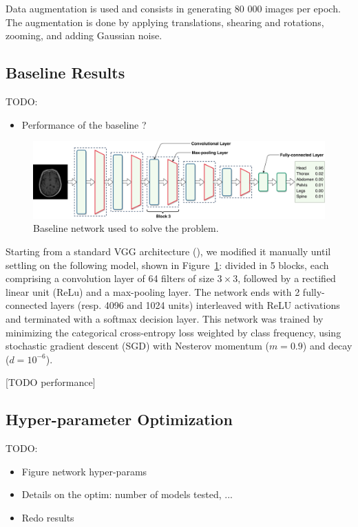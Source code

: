 Data augmentation is used and consists in generating 80 000 images per epoch. The augmentation is done by applying translations, shearing and rotations, zooming, and adding Gaussian noise.

\subsection{Baseline Results}

TODO:
\begin{itemize}
    \item Performance of the baseline ?
\end{itemize}

\begin{figure}[htb]
	\centering
	\includegraphics[width=\linewidth]{img_hyperopt/baseline.pdf}
	\caption{Baseline network used to solve the problem.}
	\label{fig:baseline}
\end{figure}

Starting from a standard VGG architecture (\textcite{simonyan2014}), we modified it manually until settling on the following model, shown in Figure~\ref{fig:baseline}: divided in 5 blocks, each comprising a convolution layer of 64 filters of size $3\times 3$, followed by a rectified linear unit (ReLu) and a max-pooling layer. The network ends with 2 fully-connected layers (resp. 4096 and 1024 units) interleaved with ReLU activations and terminated with a softmax decision layer. This network was trained by minimizing the categorical cross-entropy loss weighted by class frequency, using stochastic gradient descent (SGD) with Nesterov momentum ($m = 0.9$) and decay ($d = 10^{-6}$).

[TODO performance]

\subsection{Hyper-parameter Optimization}

TODO:
\begin{itemize}
    \item Figure network hyper-params
    \item Details on the optim: number of models tested, ...
    \item Redo results
\end{itemize}


